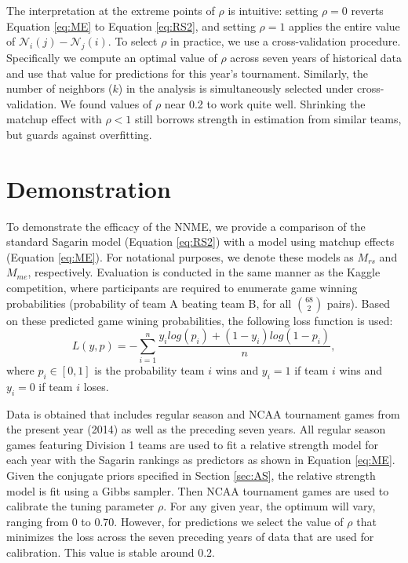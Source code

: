 \documentclass[letterpaper,12pt]{article}
\begin{document}
The interpretation at the extreme points of $\rho$ is intuitive: setting $\rho = 0$ reverts Equation \ref{eq:ME} to Equation \ref{eq:RS2}, and setting $\rho = 1$ applies the entire value of $\mathcal{N}_i(j) -\mathcal{N}_j(i)$. To select $\rho$ in practice, we use a cross-validation procedure. Specifically we compute an optimal value of $\rho$ across seven years of historical data and use that value for predictions for this year's tournament. Similarly, the number of neighbors ($k$) in the analysis is simultaneously selected under cross-validation. We found values of $\rho$ near 0.2 to work quite well. Shrinking the matchup effect with $\rho <1$ still borrows strength in estimation from similar teams, but guards against overfitting.


\section{Demonstration \label{sec:demon}}
To demonstrate the efficacy of the NNME, we provide a comparison of the standard Sagarin model (Equation \ref{eq:RS2}) with a model using matchup effects (Equation \ref{eq:ME}). For notational purposes, we denote these models as $M_{rs}$ and $M_{me}$, respectively. Evaluation is conducted in the same manner as the Kaggle competition, where participants are required to enumerate game winning probabilities (probability of team A beating team B, for all $68 \choose 2$ pairs). Based on these predicted game wining probabilities, the following loss function is used:
\begin{equation}\label{eq:kaggle_score}
L(y,p)=-\sum_{i=1}^n\frac{y_ilog(p_i)+ (1-y_i)log(1-p_i)}{n},
\end{equation}
where $p_i\in[0,1]$ is the probability team $i$ wins and $y_i=1$ if team $i$ wins and $y_i = 0$ if team $i$ loses.

Data is obtained that includes regular season and NCAA tournament games from the present year (2014) as well as the preceding seven years. All regular season games featuring Division 1 teams are used to fit a relative strength model for each year with the Sagarin rankings as predictors as shown in Equation \ref{eq:ME}. Given the conjugate priors specified in Section \ref{sec:AS}, the relative strength model is fit using a Gibbs sampler. Then NCAA tournament games are used to calibrate the tuning parameter $\rho$. For any given year, the optimum will vary, ranging from 0 to 0.70. However, for predictions we select the value of $\rho$ that minimizes the loss across the seven preceding years of data that are used for calibration. This value is stable around 0.2.
\end{document}
